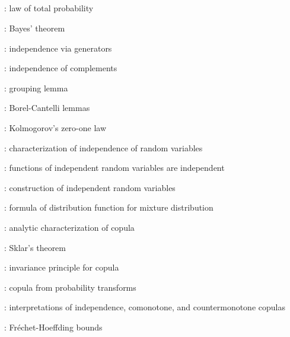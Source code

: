 \subsection*{}
\item {}: law of total probability
\item {}: Bayes' theorem
\item {}: independence via generators
\item {}: independence of complements
\item {}: grouping lemma
\item {}: Borel-Cantelli lemmas
\item {}: Kolmogorov's zero-one law
\item {}: characterization of independence of random variables
\item {}: functions of independent random variables are independent
\item {}: construction of independent random variables
\item {}: formula of distribution function for mixture distribution
\item {}: analytic characterization of copula
\item {}: Sklar's theorem
\item {}: invariance principle for copula
\item {}: copula from probability transforms
\item {}: interpretations
of independence, comonotone, and countermonotone copulas
\item {}: Fr\'echet-Hoeffding bounds
